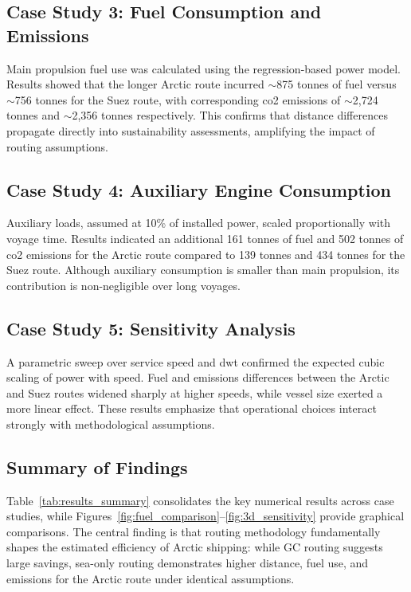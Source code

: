 
\subsection{Case Study 3: Fuel Consumption and Emissions}
Main propulsion fuel use was calculated using the regression-based power model. Results showed that the longer Arctic route incurred $\sim$875 tonnes of fuel versus $\sim$756 tonnes for the Suez route, with corresponding \ac{co2} emissions of $\sim$2,724 tonnes and $\sim$2,356 tonnes respectively. This confirms that distance differences propagate directly into sustainability assessments, amplifying the impact of routing assumptions.

\subsection{Case Study 4: Auxiliary Engine Consumption}
Auxiliary loads, assumed at 10\% of installed power, scaled proportionally with voyage time. Results indicated an additional 161 tonnes of fuel and 502 tonnes of \ac{co2} emissions for the Arctic route compared to 139 tonnes and 434 tonnes for the Suez route. Although auxiliary consumption is smaller than main propulsion, its contribution is non-negligible over long voyages.

\subsection{Case Study 5: Sensitivity Analysis}
A parametric sweep over service speed and \ac{dwt} confirmed the expected cubic scaling of power with speed. Fuel and emissions differences between the Arctic and Suez routes widened sharply at higher speeds, while vessel size exerted a more linear effect. These results emphasize that operational choices interact strongly with methodological assumptions.

\subsection{Summary of Findings}
Table~\ref{tab:results_summary} consolidates the key numerical results across case studies, while Figures~\ref{fig:fuel_comparison}--\ref{fig:3d_sensitivity} provide graphical comparisons. The central finding is that routing methodology fundamentally shapes the estimated efficiency of Arctic shipping: while GC routing suggests large savings, sea-only routing demonstrates higher distance, fuel use, and emissions for the Arctic route under identical assumptions.


